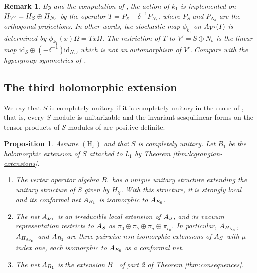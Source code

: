 \documentclass[leqno]{article}
\let\cal\relax
\newcommand{\cal}{\mathcal}
\newtheorem{prop}[thm]{Proposition}
\newtheorem{remark}[thm]{Remark}
\numberwithin{equation}{section}
\begin{document}
\begin{remark}\normalfont
By \cite[Theorem 4.22 p.~24]{Bis17b} and the computation of \cite[Section 4.6 p.~25]{Bis17b}, the action of $k_1$ is implemented on $\cal H_{V'} = \cal H_S \oplus \cal H_{N_b}$ by the operator $T = P_S-\delta^{-1}P_{N_b}$, where $P_S$ and $P_{N_b}$ are the orthogonal projections. In other words, the stochastic map $\phi_{k_1}$ on $\cal A_{V'}(I)$ is determined by $\phi_{k_1}(x)\Omega = Tx\Omega$. The restriction of $T$ to $V' = S \oplus N_b$ is the linear map $\mathrm{id}_S \oplus (-\delta^{-1})\mathrm{id}_{N_b}$, which is not an automorphism of $V'$. Compare with the hypergroup symmetries of \cite[Section 4.3 pp.~83--88]{GaR26}.
\end{remark}

\subsection{The third holomorphic extension}

We say that $S$ is completely unitary if it is completely unitary in the sense of \cite[Definition 4.2 p.~18]{CGGH23}, that is, every $S$-module is unitarizable and the invariant sesquilinear forms on the tensor products of $S$-modules of \cite{Gui19} are positive definite.

\begin{prop}
\label{prop:third-net}
Assume $\mathrm{(H_J)}$ and that $S$ is completely unitary. Let $B_1$ be the holomorphic extension of $S$ attached to $L_1$ by Theorem \ref{thm:lagrangian-extensions}.
\begin{enumerate}
\item The vertex operator algebra $B_1$ has a unique unitary structure extending the unitary structure of $S$ given by $H_\chi$. With this structure, it is strongly local and its conformal net $\cal A_{B_1}$ is isomorphic to $\cal A_{E_8}$.
\item The net $\cal A_{B_1}$ is an irreducible local extension of $\cal A_S$, and its vacuum representation restricts to $\cal A_S$ as $\pi_0 \oplus \pi_b \oplus \pi_a \oplus \pi_{c_0}$. In particular, $\cal A_{H_{\Lambda_a}}$, $\cal A_{H_{\Lambda_{c_0}}}$ and $\cal A_{B_1}$ are three pairwise non-isomorphic extensions of $\cal A_S$ with $\mu$-index one, each isomorphic to $\cal A_{E_8}$ as a conformal net.
\item The net $\cal A_{B_1}$ is the extension $\cal B_1$ of part 2 of Theorem \ref{thm:consequences}.
\end{enumerate}
\end{prop}
\end{document}
